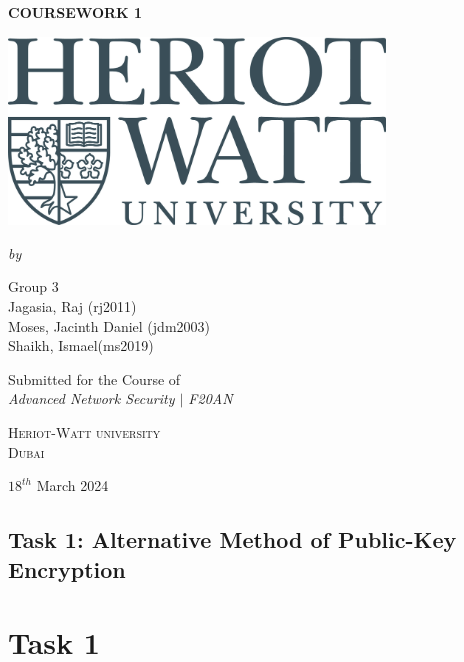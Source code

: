 \documentclass{report}
\date{}
\begin{document}
\begin{titlepage}
    \begin{center}
    \begin{spacing}{1.8}
      {\Large\bfseries{COURSEWORK 1}}\\
    \end{spacing}
  
    \vspace{40pt}\par
    \includegraphics[width=10cm]{./Figures/HWUlogo.jpg}
    \vspace{40pt}\par
  
    {\itshape\fontsize{15.5pt}{15pt}\selectfont by\\}\vspace{15pt}\par
  
    {\Large Group 3\\[1em] Jagasia, Raj (rj2011) \\[0.5em] Moses, Jacinth Daniel (jdm2003) \\[0.5em] Shaikh, Ismael(ms2019)    \vspace{50pt}}
    
    {
    \large Submitted for the Course of \\ \vspace{5pt} \Large\slshape{Advanced Network Security $|$ F20AN}\\
    }
    
    \vspace{15pt}\par
    
    {\scshape{} Heriot-Watt university\\ Dubai}
    
    \vspace{25pt}\par
    
    
    {\large $18^{th}$ March 2024}
  \end{center}
\end{titlepage}
\newpage

\section*{Task 1: Alternative Method of Public-Key Encryption}


\newpage
\appendix
\chapter{Task 1}
\end{document}
